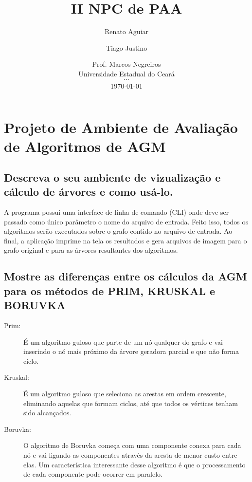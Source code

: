 \documentclass[12pt,a4paper]{article}
\title{II NPC de PAA}
\author{ Renato Aguiar \and Tiago Justino }
\date{
    Prof. Marcos Negreiros \\
	Universidade Estadual do Ceará \\
	$\cdots$ \\
	\today
}
\begin{document}
\maketitle

\section{Projeto de Ambiente de Avaliação de Algoritmos de AGM}
\subsection{Descreva o seu ambiente de vizualização e cálculo de árvores e como
usá-lo.}

A programa possui uma interface de linha de comando (CLI) onde deve ser passado
como único parâmetro o nome do arquivo de entrada. Feito isso, todos os
algoritmos serão executados sobre o grafo contido no arquivo de entrada. Ao
final, a aplicação imprime na tela os resultados e gera arquivos de imagem para
o grafo original e para as árvores resultantes dos algoritmos.

\subsection{Mostre as diferenças entre os cálculos da AGM para os métodos de
PRIM, KRUSKAL e BORUVKA}

\begin{description}
\item[Prim:] É um algoritmo guloso que parte de um nó qualquer do grafo e vai
inserindo o nó mais próximo da árvore geradora parcial e que não forma ciclo.
\item[Kruskal:] É um algoritmo guloso que seleciona as arestas em ordem crescente,
eliminando aquelas que formam ciclos, até que todos os vértices tenham sido
alcançados.
\item[Boruvka:] O algoritmo de Boruvka começa com uma componente conexa para
cada nó e vai ligando as componentes através da aresta de menor custo entre
elas. Um característica interessante desse algoritmo é que o processamento de
cada componente pode ocorrer em paralelo.
\end{description}
\end{document}
